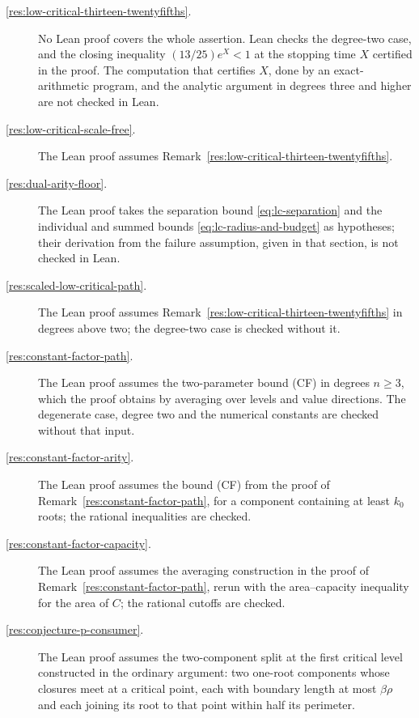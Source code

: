 \documentclass[11pt]{article}
\begin{document}
\begin{description}
\item[\ref{res:low-critical-thirteen-twentyfifths}.] No Lean proof covers the whole assertion. Lean checks the
degree-two case, and the closing inequality $(13/25)e^X<1$ at the stopping
time $X$ certified in the proof. The computation that certifies $X$, done by an
exact-arithmetic program, and the analytic argument in degrees three and
higher are not checked in Lean.

\item[\ref{res:low-critical-scale-free}.] The Lean proof assumes
Remark~\ref{res:low-critical-thirteen-twentyfifths}.

\item[\ref{res:dual-arity-floor}.] The Lean proof takes the separation bound
\eqref{eq:lc-separation} and the individual and summed bounds
\eqref{eq:lc-radius-and-budget} as hypotheses; their derivation from the
failure assumption, given in that section, is not checked in Lean.

\item[\ref{res:scaled-low-critical-path}.] The Lean proof assumes
Remark~\ref{res:low-critical-thirteen-twentyfifths} in degrees above two;
the degree-two case is checked without it.

\item[\ref{res:constant-factor-path}.] The Lean proof assumes the two-parameter bound (CF)
in degrees $n\ge3$, which the proof obtains by averaging over levels and
value directions. The degenerate case, degree two and the numerical
constants are checked without that input.

\item[\ref{res:constant-factor-arity}.] The Lean proof assumes the bound (CF) from the proof of
Remark~\ref{res:constant-factor-path}, for a component containing at least
$k_0$ roots; the rational inequalities are checked.

\item[\ref{res:constant-factor-capacity}.] The Lean proof assumes the averaging construction in the
proof of Remark~\ref{res:constant-factor-path}, rerun with the
area--capacity inequality for the area of $C$; the rational cutoffs are
checked.

\item[\ref{res:conjecture-p-consumer}.] The Lean proof assumes the two-component split at the
first critical level constructed in the ordinary argument: two one-root
components whose closures meet at a critical point, each with boundary
length at most $\beta\rho$ and each joining its root to that point within
half its perimeter.


\end{description}
\end{document}
